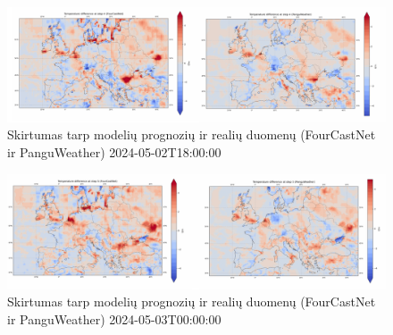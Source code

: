 \documentclass[conference]{IEEEtran}
\begin{document}
\begin{figure}[htb!] %
\centerline{\includegraphics[width=\textwidth]{img/diffstep4.png}}
\caption{Skirtumas tarp modelių prognozių ir realių duomenų (FourCastNet ir PanguWeather) 2024-05-02T18:00:00}
\label{fig13}
\end{figure}

\begin{figure}[htb!] %
\centerline{\includegraphics[width=\textwidth]{img/diffstep5.png}}
\caption{Skirtumas tarp modelių prognozių ir realių duomenų (FourCastNet ir PanguWeather) 2024-05-03T00:00:00}
\label{fig14}
\end{figure}



\end{document}
